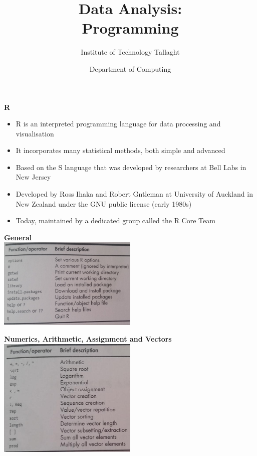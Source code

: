 \documentclass[a4paper,landscape]{slides}
\begin{document}
\title{\Huge \bfseries Data Analysis: \\ Programming}
\author{\vspace{1cm} Institute of Technology Tallaght}
\date{Department of Computing}
\maketitle
\newpage



{\Large \bfseries R}
\vspace{-1cm}
\begin{itemize}
\setlength\itemsep{-0.5em}
\item R is an interpreted programming language for data processing and visualisation
\item It incorporates many statistical methods, both simple and advanced
\item Based on the S language that was developed by researchers at Bell Labs in New Jersey
\item Developed by Ross Ihaka and Robert Gntleman at University of Auckland in New Zealand under the GNU public license (early 1980s)
\item Today, maintained by a dedicated group called the R Core Team
\end{itemize}
\newpage

{\bfseries General\\}
\includegraphics[width=0.5\textwidth]{ch1.jpg}
\newpage

{\bfseries Numerics, Arithmetic, Assignment and Vectors\\}
\includegraphics[width=0.5\textwidth]{ch2.jpg}
\newpage
\end{document}
